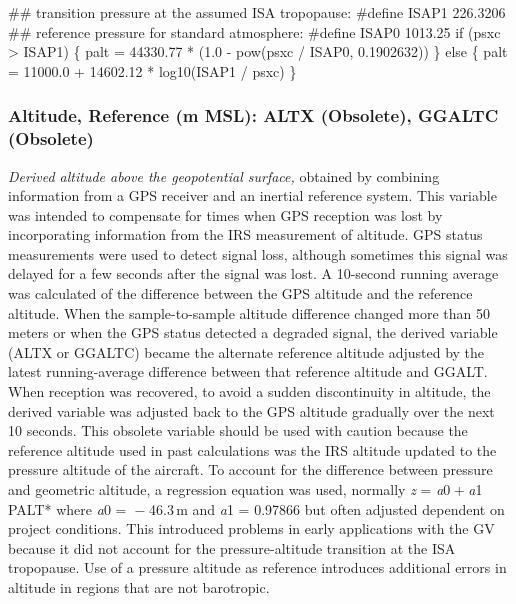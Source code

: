 \documentclass[
]{book}
\newenvironment{Shaded}{\begin{snugshade}}{\end{snugshade}}
\newcommand{\NormalTok}[1]{#1}
\begin{document}
\begin{Shaded}
\begin{Highlighting}[]
\NormalTok{       \#\# transition pressure at the assumed ISA tropopause:}
\NormalTok{       \#define ISAP1 226.3206}
\NormalTok{       \#\# reference pressure for standard atmosphere:}
\NormalTok{       \#define ISAP0 1013.25}
\NormalTok{       if (psxc \textgreater{} ISAP1) \{}
\NormalTok{         palt = 44330.77 * (1.0 {-} pow(psxc / ISAP0, 0.1902632))}
\NormalTok{       \} else \{}
\NormalTok{         palt = 11000.0 + 14602.12 * log10(ISAP1 / psxc)}
\NormalTok{       \}}
\end{Highlighting}
\end{Shaded}

\hypertarget{altx}{%
\subsubsection*{Altitude, Reference (m MSL): ALTX (Obsolete), GGALTC (Obsolete)}\label{altx}}

\emph{Derived altitude above the geopotential surface,} obtained by combining information from a GPS receiver and an inertial reference system. This variable was intended to compensate for times when GPS reception was lost by incorporating information from the IRS measurement of altitude. GPS status measurements were used to detect signal loss, although sometimes this signal was delayed for a few seconds after the signal was lost. A 10-second running average was calculated of the difference between the GPS altitude and the reference altitude. When the sample-to-sample altitude difference changed more than 50 meters or when the GPS status detected a degraded signal, the derived variable (ALTX or GGALTC) became the alternate reference altitude adjusted by the latest running-average difference between that reference altitude and GGALT. When reception was recovered, to avoid a sudden discontinuity in altitude, the derived variable was adjusted back to the GPS altitude gradually over the next 10 seconds.
This obsolete variable should be used with caution because the reference altitude used in past calculations was the IRS altitude updated to the pressure altitude of the aircraft. To account for the difference between pressure and geometric altitude, a regression equation was used, normally \emph{z} = \emph{a}0 + \emph{a}1 \emph{ }PALT* where {\emph{a}0 =  − 46.3} m and {\emph{a}1 = 0.97866} but often adjusted dependent on project conditions. This introduced problems in early applications with the GV because it did not account for the pressure-altitude transition at the ISA tropopause. Use of a pressure altitude as reference introduces additional errors in altitude in regions that are not barotropic.
\end{document}
